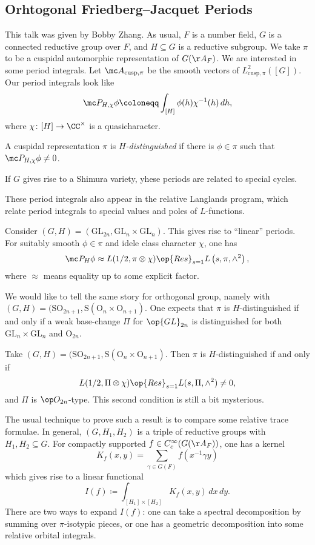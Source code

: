 \documentclass{article}
\begin{document}
\subsection{Orhtogonal Friedberg--Jacquet Periods}
This talk was given by Bobby Zhang. As usual, $F$ is a number field, $G$ is a connected reductive group over $F$, and $H\subseteq G$ is a reductive subgroup. We take $\pi$ to be a cuspidal automorphic representation of $G(\AA_F)$. We are interested in some period integrals. Let $\mc A_{\mathrm{cusp},\pi}$ be the smooth vectors of $L^2_{\mathrm{cusp},\pi}([G])$. Our period integrals look like
\[\mc P_{H,\chi}\phi\coloneqq\int_{[H]}\phi(h)\chi^{-1}(h)\,dh,\]
where $\chi\colon[H]\to\CC^\times$ is a quasicharacter.
\begin{definition}
	A cuspidal representation $\pi$ is \textit{$H$-distinguished} if there is $\phi\in\pi$ such that $\mc P_{H,\chi}\phi\ne0$.
\end{definition}
\begin{remark}
	If $G$ gives rise to a Shimura variety, yhese periods are related to special cycles.
\end{remark}
\begin{remark}
	These period integrals also appear in the relative Langlands program, which relate period integrals to special values and poles of $L$-functions.
\end{remark}
\begin{example}
	Consider $(G,H)=(\mathrm{GL}_{2n},\mathrm{GL}_n\times\mathrm{GL}_n)$. This gives rise to ``linear'' periods. For suitably smooth $\phi\in\pi$ and idele class character $\chi$, one has
	\[\mc P_H\phi\approx L(1/2,\pi\otimes\chi)\op{Res}_{s=1}L\left(s,\pi,\land^2\right),\]
	where $\approx$ means equality up to some explicit factor.
\end{example}
We would like to tell the same story for orthogonal group, namely with $(G,H)=(\mathrm{SO}_{2n+1},\mathrm S(\mathrm O_n\times\mathrm O_{n+1})$. One expects that $\pi$ is $H$-distinguished if and only if a weak base-change $\Pi$ for $\op{GL}_{2n}$ is distinguished for both $\mathrm{GL}_n\times\mathrm{GL}_n$ and $\mathrm O_{2n}$.
\begin{example}
	Take $(G,H)=(\mathrm{SO}_{2n+1},\mathrm S(\mathrm O_n\times\mathrm O_{n+1})$. Then $\pi$ is $H$-distinguished if and only if
	\[L(1/2,\Pi\otimes\chi)\op{Res}_{s=1}L(s,\Pi,\land^2)\ne0,\]
	and $\Pi$ is $\op O_{2n}$-type. This second condition is still a bit mysterious.
\end{example}
The usual technique to prove such a result is to compare some relative trace formulae. In general, $(G,H_1,H_2)$ is a triple of reductive groups with $H_1,H_2\subseteq G$. For compactly supported $f\in C_c^\infty(G(\AA_F))$, one has a kernel
\[K_f(x,y)=\sum_{\gamma\in G(F)} f(x^{-1}\gamma y)\]
which gives rise to a linear functional
\[I(f)\coloneqq\int_{[H_1]\times[H_2]}K_f(x,y)\,dx\,dy.\]
There are two ways to expand $I(f)$: one can take a spectral decomposition by summing over $\pi$-isotypic pieces, or one has a geometric decomposition into some relative orbital integrals.
\end{document}
